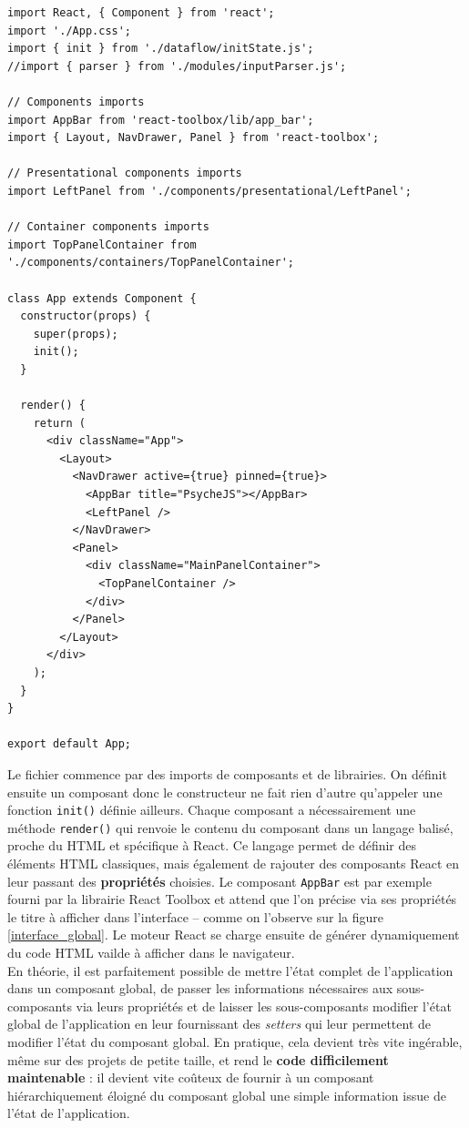 \begin{verbatim}
import React, { Component } from 'react';
import './App.css';
import { init } from './dataflow/initState.js';
//import { parser } from './modules/inputParser.js';

// Components imports
import AppBar from 'react-toolbox/lib/app_bar';
import { Layout, NavDrawer, Panel } from 'react-toolbox';

// Presentational components imports
import LeftPanel from './components/presentational/LeftPanel';

// Container components imports
import TopPanelContainer from './components/containers/TopPanelContainer';

class App extends Component {
  constructor(props) {
    super(props);
    init();
  }

  render() {
    return (
      <div className="App">
        <Layout>
          <NavDrawer active={true} pinned={true}>
            <AppBar title="PsycheJS"></AppBar>
            <LeftPanel />
          </NavDrawer>
          <Panel>
            <div className="MainPanelContainer">
              <TopPanelContainer />
            </div>
          </Panel>
        </Layout>
      </div>
    );
  }
}

export default App;
\end{verbatim}

Le fichier commence par des imports de composants et de librairies. On définit ensuite un composant donc le constructeur ne fait rien d'autre qu'appeler une fonction \texttt{init()} définie ailleurs. Chaque composant a nécessairement une méthode \texttt{render()} qui renvoie le contenu du composant dans un langage balisé, proche du HTML et spécifique à React. Ce langage permet de définir des éléments HTML classiques, mais également de rajouter des composants React en leur passant des \textbf{propriétés} choisies. Le composant \texttt{AppBar} est par exemple fourni par la librairie React Toolbox et attend que l'on précise via ses propriétés le titre à afficher dans l'interface -- comme on l'observe sur la figure \ref{interface_global}. Le moteur React se charge ensuite de générer dynamiquement du code HTML vailde à afficher dans le navigateur.\\

En théorie, il est parfaitement possible de mettre l'état complet de l'application dans un composant global, de passer les informations nécessaires aux sous-composants via leurs propriétés et de laisser les sous-composants modifier l'état global de l'application en leur fournissant des \textit{setters} qui leur permettent de modifier l'état du composant global. En pratique, cela devient très vite ingérable, même sur des projets de petite taille, et rend le \textbf{code difficilement maintenable} : il devient vite coûteux de fournir à un composant hiérarchiquement éloigné du composant global une simple information issue de l'état de l'application.\\

